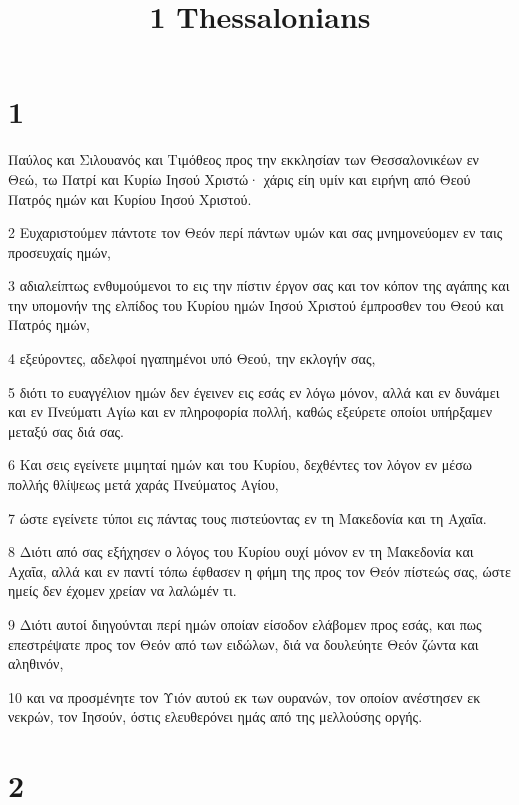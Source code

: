 

\title{1 Thessalonians}


\chapter{1}

\par Παύλος και Σιλουανός και Τιμόθεος προς την εκκλησίαν των Θεσσαλονικέων εν Θεώ, τω Πατρί και Κυρίω Ιησού Χριστώ· χάρις είη υμίν και ειρήνη από Θεού Πατρός ημών και Κυρίου Ιησού Χριστού.
\par 2 Ευχαριστούμεν πάντοτε τον Θεόν περί πάντων υμών και σας μνημονεύομεν εν ταις προσευχαίς ημών,
\par 3 αδιαλείπτως ενθυμούμενοι το εις την πίστιν έργον σας και τον κόπον της αγάπης και την υπομονήν της ελπίδος του Κυρίου ημών Ιησού Χριστού έμπροσθεν του Θεού και Πατρός ημών,
\par 4 εξεύροντες, αδελφοί ηγαπημένοι υπό Θεού, την εκλογήν σας,
\par 5 διότι το ευαγγέλιον ημών δεν έγεινεν εις εσάς εν λόγω μόνον, αλλά και εν δυνάμει και εν Πνεύματι Αγίω και εν πληροφορία πολλή, καθώς εξεύρετε οποίοι υπήρξαμεν μεταξύ σας διά σας.
\par 6 Και σεις εγείνετε μιμηταί ημών και του Κυρίου, δεχθέντες τον λόγον εν μέσω πολλής θλίψεως μετά χαράς Πνεύματος Αγίου,
\par 7 ώστε εγείνετε τύποι εις πάντας τους πιστεύοντας εν τη Μακεδονία και τη Αχαΐα.
\par 8 Διότι από σας εξήχησεν ο λόγος του Κυρίου ουχί μόνον εν τη Μακεδονία και Αχαΐα, αλλά και εν παντί τόπω έφθασεν η φήμη της προς τον Θεόν πίστεώς σας, ώστε ημείς δεν έχομεν χρείαν να λαλώμέν τι.
\par 9 Διότι αυτοί διηγούνται περί ημών οποίαν είσοδον ελάβομεν προς εσάς, και πως επεστρέψατε προς τον Θεόν από των ειδώλων, διά να δουλεύητε Θεόν ζώντα και αληθινόν,
\par 10 και να προσμένητε τον Υιόν αυτού εκ των ουρανών, τον οποίον ανέστησεν εκ νεκρών, τον Ιησούν, όστις ελευθερόνει ημάς από της μελλούσης οργής.

\chapter{2}

